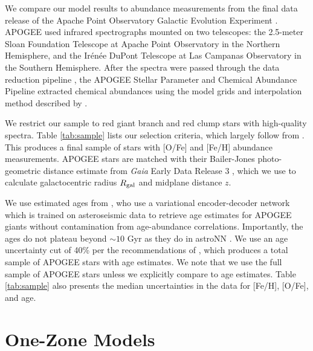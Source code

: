 \documentclass[twocolumn,twocolappendix,linenumbers]{aastex631}
\begin{document}
We compare our model results to abundance measurements from the final data release \citep[DR17;][]{Abdurro'uf2022-SDSSIV-DR17} of the Apache Point Observatory Galactic Evolution Experiment \citep[APOGEE;][]{Majewski2017-APOGEE}. APOGEE used infrared spectrographs \citep{Wilson2019-APOGEE-Spectrographs} mounted on two telescopes: the 2.5-meter Sloan Foundation Telescope \citep{Gunn2006-SloanTelescope} at Apache Point Observatory in the Northern Hemisphere, and the Ir{\'e}n{\'e}e DuPont Telescope \citep{BowenVaughan1973-DuPontTelescope} at Las Campanas Observatory in the Southern Hemisphere. After the spectra were passed through the data reduction pipeline \citep{Nidever2015-APOGEE-DataReduction}, the APOGEE Stellar Parameter and Chemical Abundance Pipeline \citep[ASPCAP;][]{Holtzmann2015-ASPCAP,GarciaPerez2016-ASPCAP} extracted chemical abundances using the model grids and interpolation method described by \citet{Jonsson2020-APOGEE-DR16}.

We restrict our sample to red giant branch and red clump stars with high-quality spectra. Table \ref{tab:sample} lists our selection criteria, which largely follow from \citet{Hayden2015-ChemicalCartography}. This produces a final sample of stars with [O/Fe] and [Fe/H] abundance measurements. APOGEE stars are matched with their Bailer-Jones photo-geometric distance estimate from \textit{Gaia} Early Data Release 3 \citep{Gaia2016-Mission,Gaia2021-EDR3}, which we use to calculate galactocentric radius $R_{\rm gal}$ and midplane distance $z$.

We use estimated ages from \citet[][hereafter ]{Leung2023-Ages}, who use a variational encoder-decoder network which is trained on asteroseismic data to retrieve age estimates for APOGEE giants without contamination from age-abundance correlations. Importantly, the  ages do not plateau beyond $\sim10$ Gyr as they do in astroNN \citep{Mackereth2019-astroNN-Ages}. We use an age uncertainty cut of 40\% per the recommendations of , which produces a total sample of APOGEE stars with age estimates. We note that we use the full sample of APOGEE stars unless we explicitly compare to age estimates. Table \ref{tab:sample} also presents the median uncertainties in the data for [Fe/H], [O/Fe], and age.

\section{One-Zone Models}
\label{sec:onezone-results}
\end{document}
